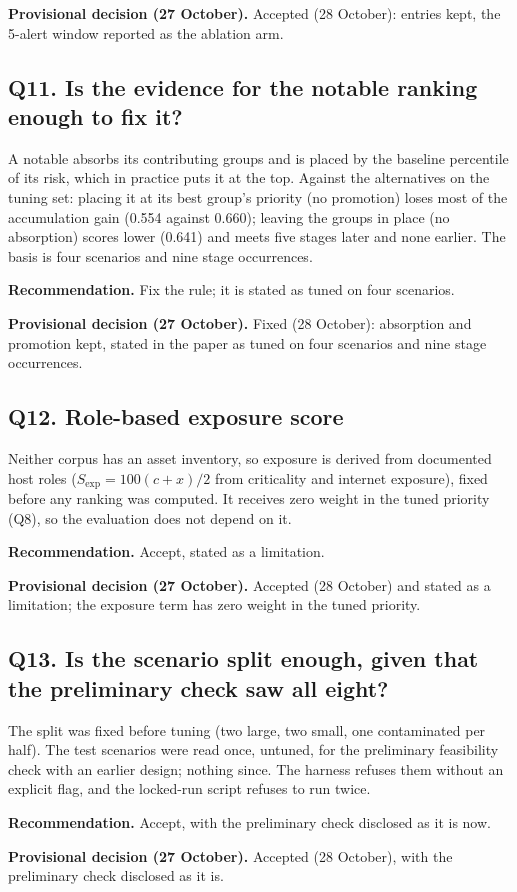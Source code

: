 \documentclass[10.5pt,a4paper]{article}
\newcommand{\rec}[1]{\par\smallskip\noindent\colorbox{gray!12}{\parbox{\dimexpr\linewidth-2\fboxsep}{\textbf{Recommendation.} #1}}\par\smallskip}
\newcommand{\dec}[1]{\par\smallskip\noindent\colorbox{blue!8}{\parbox{\dimexpr\linewidth-2\fboxsep}{\textbf{Provisional decision (27 October).} #1}}\par\medskip}
\begin{document}
\dec{Accepted (28 October): entries kept, the 5-alert window reported as the ablation arm.}

\subsection*{Q11. Is the evidence for the notable ranking enough to fix it?}
A notable absorbs its contributing groups and is placed by the baseline percentile of its risk, which in practice puts it at the top. Against the alternatives on the tuning set: placing it at its best group's priority (no promotion) loses most of the accumulation gain (0.554 against 0.660); leaving the groups in place (no absorption) scores lower (0.641) and meets five stages later and none earlier. The basis is four scenarios and nine stage occurrences.
\rec{Fix the rule; it is stated as tuned on four scenarios.}

\dec{Fixed (28 October): absorption and promotion kept, stated in the paper as tuned on four scenarios and nine stage occurrences.}

\subsection*{Q12. Role-based exposure score}
Neither corpus has an asset inventory, so exposure is derived from documented host roles ($S_\mathrm{exp} = 100(c+x)/2$ from criticality and internet exposure), fixed before any ranking was computed. It receives zero weight in the tuned priority (Q8), so the evaluation does not depend on it.
\rec{Accept, stated as a limitation.}

\dec{Accepted (28 October) and stated as a limitation; the exposure term has zero weight in the tuned priority.}

\subsection*{Q13. Is the scenario split enough, given that the preliminary check saw all eight?}
The split was fixed before tuning (two large, two small, one contaminated per half). The test scenarios were read once, untuned, for the preliminary feasibility check with an earlier design; nothing since. The harness refuses them without an explicit flag, and the locked-run script refuses to run twice.
\rec{Accept, with the preliminary check disclosed as it is now.}

\dec{Accepted (28 October), with the preliminary check disclosed as it is.}
\end{document}
